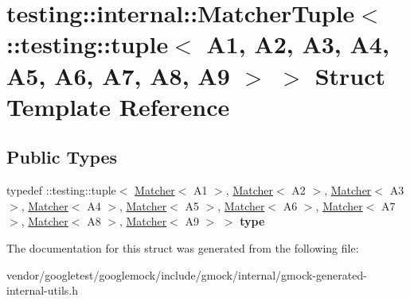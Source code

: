 \hypertarget{structtesting_1_1internal_1_1MatcherTuple_3_01_1_1testing_1_1tuple_3_01A1_00_01A2_00_01A3_00_01Aa73012c63a4e11ec83732b0fb70972c7}{}\section{testing\+:\+:internal\+:\+:Matcher\+Tuple$<$ \+:\+:testing\+:\+:tuple$<$ A1, A2, A3, A4, A5, A6, A7, A8, A9 $>$ $>$ Struct Template Reference}
\label{structtesting_1_1internal_1_1MatcherTuple_3_01_1_1testing_1_1tuple_3_01A1_00_01A2_00_01A3_00_01Aa73012c63a4e11ec83732b0fb70972c7}
\subsection*{Public Types}
\begin{DoxyCompactItemize}
\item 
typedef \+::testing\+::tuple$<$ \hyperlink{classtesting_1_1Matcher}{Matcher}$<$ A1 $>$, \hyperlink{classtesting_1_1Matcher}{Matcher}$<$ A2 $>$, \hyperlink{classtesting_1_1Matcher}{Matcher}$<$ A3 $>$, \hyperlink{classtesting_1_1Matcher}{Matcher}$<$ A4 $>$, \hyperlink{classtesting_1_1Matcher}{Matcher}$<$ A5 $>$, \hyperlink{classtesting_1_1Matcher}{Matcher}$<$ A6 $>$, \hyperlink{classtesting_1_1Matcher}{Matcher}$<$ A7 $>$, \hyperlink{classtesting_1_1Matcher}{Matcher}$<$ A8 $>$, \hyperlink{classtesting_1_1Matcher}{Matcher}$<$ A9 $>$ $>$ {\bfseries type}\hypertarget{structtesting_1_1internal_1_1MatcherTuple_3_01_1_1testing_1_1tuple_3_01A1_00_01A2_00_01A3_00_01Aa73012c63a4e11ec83732b0fb70972c7_a022b424844dde9c01e4e40716be48f9f}{}\label{structtesting_1_1internal_1_1MatcherTuple_3_01_1_1testing_1_1tuple_3_01A1_00_01A2_00_01A3_00_01Aa73012c63a4e11ec83732b0fb70972c7_a022b424844dde9c01e4e40716be48f9f}

\end{DoxyCompactItemize}


The documentation for this struct was generated from the following file\+:\begin{DoxyCompactItemize}
\item 
vendor/googletest/googlemock/include/gmock/internal/gmock-\/generated-\/internal-\/utils.\+h\end{DoxyCompactItemize}
